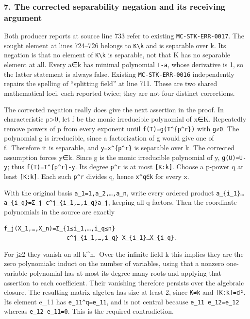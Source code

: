 \subsubsection{7. The corrected separability negation and its receiving argument}\label{the-corrected-separability-negation-and-its-receiving-argument}

Both producer reports at source line 733 refer to existing \texttt{MC-STK-ERR-0017}. The sought element at lines 724--726 belongs to \texttt{K\textbackslash{}k} and is separable over k. Its negation is that no element of \texttt{K\textbackslash{}k} is separable, not that K has no separable element at all. Every a∈k has minimal polynomial \texttt{T-a}, whose derivative is 1, so the latter statement is always false. Existing \texttt{MC-STK-ERR-0016} independently repairs the spelling of ``splitting field'' at line 711. These are two shared mathematical loci, each reported twice; they are not four distinct corrections.

The corrected negation really does give the next assertion in the proof. In characteristic p\textgreater0, let f be the monic irreducible polynomial of x∈K. Repeatedly remove powers of p from every exponent until \texttt{f(T)=g(T\^{}\{p\^{}r\})} with \texttt{g\textquotesingle{}≠0}. The polynomial g is irreducible, since a factorization of g would give one of f.~Therefore it is separable, and \texttt{y=x\^{}\{p\^{}r\}} is separable over k. The corrected assumption forces y∈k. Since g is the monic irreducible polynomial of y, \texttt{g(U)=U-y}; thus \texttt{f(T)=T\^{}\{p\^{}r\}-y}. Its degree \texttt{p\^{}r} is at most \texttt{{[}K:k{]}}. Choose a p-power q at least \texttt{{[}K:k{]}}. Each such \texttt{p\^{}r} divides q, hence \texttt{x\^{}q∈k} for every x.

With the original basis \texttt{a\_1=1,a\_2,…,a\_n}, write every ordered product \texttt{a\_\{i\_1\}…a\_\{i\_q\}=Σ\_j\ c\^{}j\_\{i\_1,…,i\_q\}a\_j}, keeping all q factors. Then the coordinate polynomials in the source are exactly

\begin{verbatim}
f_j(X_1,…,X_n)=Σ_{1≤i_1,…,i_q≤n}
                  c^j_{i_1,…,i_q} X_{i_1}…X_{i_q}.
\end{verbatim}

For j≥2 they vanish on all k\^{}n.~Over the infinite field k this implies they are the zero polynomials: induct on the number of variables, using that a nonzero one-variable polynomial has at most its degree many roots and applying that assertion to each coefficient. Their vanishing therefore persists over the algebraic closure. The resulting matrix algebra has size at least 2, since \texttt{K≠k} and \texttt{{[}K:k{]}=d²}. Its element e\_11 has \texttt{e\_11\^{}q=e\_11}, and is not central because \texttt{e\_11\ e\_12=e\_12} whereas \texttt{e\_12\ e\_11=0}. This is the required contradiction.


